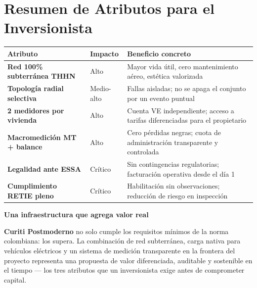 \section{Resumen de Atributos para el Inversionista}

\begin{tabularx}{\linewidth}{
  >{\bfseries}X
  >{\centering\arraybackslash}p{2.8cm}
  X}
  \toprule
  Atributo & Impacto & Beneficio concreto \\
  \midrule
  Red 100\% subterr\'anea THHN &
    Alto &
    Mayor vida \'util, cero mantenimiento a\'ereo,
    est\'etica valorizada \\
  Topolog\'ia radial selectiva &
    Medio-alto &
    Fallas aisladas; no se apaga el conjunto
    por un evento puntual \\
  2 medidores por vivienda &
    Alto &
    Cuenta VE independiente; acceso a tarifas
    diferenciadas para el propietario \\
  Macromedici\'on MT + balance &
    Alto &
    Cero p\'erdidas negras; cuota de administraci\'on
    transparente y controlada \\
  Legalidad ante ESSA &
    Cr\'itico &
    Sin contingencias regulatorias;
    facturaci\'on operativa desde el d\'ia 1 \\
  Cumplimiento RETIE pleno &
    Cr\'itico &
    Habilitaci\'on sin observaciones;
    reducci\'on de riesgo en inspecci\'on \\
  \bottomrule
\end{tabularx}

\vspace{12pt}
\begin{darkbox}
  {\bfseries\color{GoldAccent}
    Una infraestructura que agrega valor real\par}
  \vspace{6pt}
  \textbf{Curiti Postmoderno} no solo cumple los requisitos
  m\'inimos de la norma colombiana: los supera. La combinaci\'on
  de red subterr\'anea, carga nativa para veh\'iculos el\'ectricos
  y un sistema de medici\'on transparente en la frontera del
  proyecto representa una propuesta de valor diferenciada,
  auditable y sostenible en el tiempo --- los tres atributos
  que un inversionista exige antes de comprometer capital.
\end{darkbox}